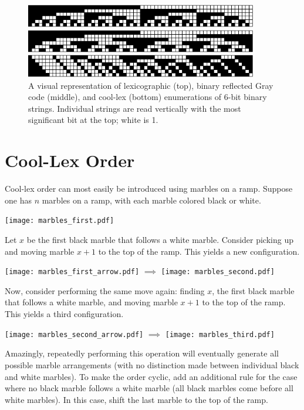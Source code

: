 \begin{figure}
    \centering
\includegraphics[width=4in]{BLX6-cropped.pdf} 

\includegraphics[width=4in]{BRGC6-cropped.pdf} 

\includegraphics[width=4in]{BCLX6-cropped.pdf} 

    \caption[A visual representation of lexicographic (top), binary reflected Gray code (middle), and cool-lex (bottom) enumerations of 6-bit binary strings.]{A visual representation of lexicographic (top), binary reflected Gray code (middle), and cool-lex (bottom) enumerations of 6-bit binary strings. Individual strings are read vertically with the most significant bit at the top; white is 1.
    }
    \label{binary}
\end{figure}

\section{Cool-Lex Order} \label{sec:coolIntro}

Cool-lex order can most easily be introduced using marbles on a ramp. Suppose one has $n$ marbles on a ramp, with each marble colored black or white.  

\texttt{[image: marbles\_first.pdf]} 


Let $x$ be the first black marble that follows a white marble. Consider picking up and moving marble $x+1$ to the top of the ramp. This yields a new configuration.

\texttt{[image: marbles\_first\_arrow.pdf]} $\implies$
\texttt{[image: marbles\_second.pdf]} 

Now, consider performing the same move again: finding $x$, the first black marble that follows a white marble, and moving marble $x+1$ to the top of the ramp. This yields a third configuration.

\texttt{[image: marbles\_second\_arrow.pdf]} $\implies$
\texttt{[image: marbles\_third.pdf]} 

Amazingly, repeatedly performing this operation will eventually generate all possible marble arrangements (with no distinction made between individual black and white marbles). To make the order cyclic, add an additional rule for the case where no black marble follows a white marble (all black marbles come before all white marbles).  In this case, shift the last marble to the top of the ramp.

